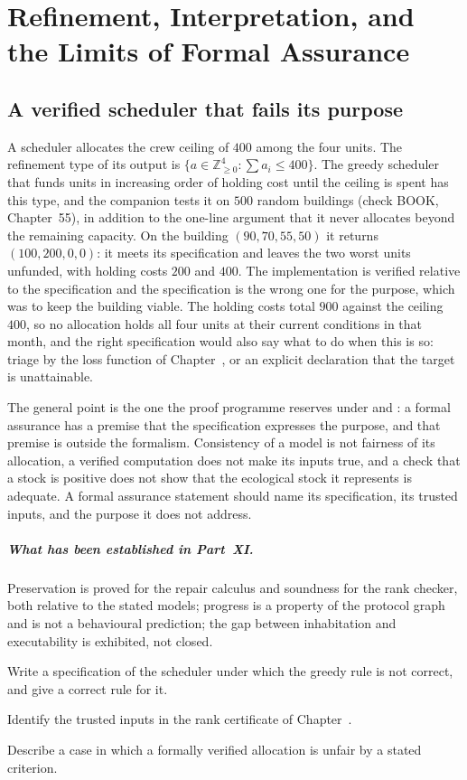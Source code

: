 \chapter{Refinement, Interpretation, and the Limits of Formal Assurance}\label{ch:55}

\section{A verified scheduler that fails its purpose}

A scheduler allocates the crew ceiling of $400$ among the four units. The refinement type of its output is $\{a\in\mathbb{Z}^4_{\ge0}:\sum a_i\le 400\}$. The greedy scheduler that funds units in increasing order of holding cost until the ceiling is spent has this type, and the companion tests it on $500$ random buildings (check BOOK, Chapter~55), in addition to the one-line argument that it never allocates beyond the remaining capacity. On the building $(90,70,55,50)$ it returns $(100,200,0,0)$: it meets its specification and leaves the two worst units unfunded, with holding costs $200$ and $400$. The implementation is verified relative to the specification and the specification is the wrong one for the purpose, which was to keep the building viable. The holding costs total $900$ against the ceiling $400$, so no allocation holds all four units at their current conditions in that month, and the right specification would also say what to do when this is so: triage by the loss function of Chapter~, or an explicit declaration that the target is unattainable.

The general point is the one the proof programme reserves under  and : a formal assurance has a premise that the specification expresses the purpose, and that premise is outside the formalism. Consistency of a model is not fairness of its allocation, a verified computation does not make its inputs true, and a check that a stock is positive does not show that the ecological stock it represents is adequate. A formal assurance statement should name its specification, its trusted inputs, and the purpose it does not address.

\paragraph{What has been established in Part~XI.} Preservation is proved for the repair calculus and soundness for the rank checker, both relative to the stated models; progress is a property of the protocol graph and is not a behavioural prediction; the gap between inhabitation and executability is exhibited, not closed.

\begin{exercise}Write a specification of the scheduler under which the greedy rule is not correct, and give a correct rule for it.\end{exercise}
\begin{exercise}Identify the trusted inputs in the rank certificate of Chapter~.\end{exercise}
\begin{exercise}Describe a case in which a formally verified allocation is unfair by a stated criterion.\end{exercise}
